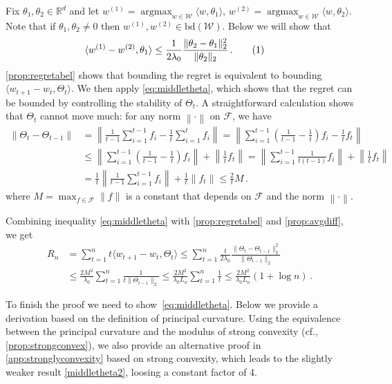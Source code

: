 \documentclass[english]{article}
\newcommand{\cW}{\mathcal{W}}
\newcommand{\cF}{\mathcal{F}}
\newcommand{\real}{\mathbb{R}}
\newcommand{\inpro}[2]{\langle #1, #2\rangle}
\newcommand{\ip}[1]{\langle#1\rangle}
\newcommand{\norm}[1]{\left\| #1 \right\|}
\newcommand{\bd}{\mathrm{bd}}
\newcommand\numberthis{\addtocounter{equation}{1}\tag{\theequation}}
\DeclareMathOperator*{\argmax}{argmax}
\newenvironment{proofof}[1]{\par\noindent{\bf Proof of #1\ }}{\hfill\BlackBox\\[2mm]}
\begin{document}
\begin{proofof}{\cref{thm:R_curvesurface}}
Fix  $\theta_1, \theta_2 \in \real^d$ and let 
$w^{(1)} = \argmax_{w\in\cW}\inpro{w}{\theta_1}$,
$w^{(2)} = \argmax_{w\in\cW}\inpro{w}{\theta_2}$. 
Note that if $\theta_1,\theta_2\ne 0$ then $w^{(1)} , w^{(2)}  \in \bd(\cW)$. 
Below we will show that
\begin{align*}
\inpro{w^{(1)} - w^{(2)} }{\theta_1} 
	& \le \frac{1}{2\lambda_0} \frac{\|\theta_2 - \theta_1\|_2^2}{\|\theta_2\|_2}\,.
	 \numberthis\label{eq:middletheta}
\end{align*}
\cref{prop:regretabel} shows that bounding the regret is equivalent to bounding $\ip{w_{t+1}-w_t,\Theta_t}$. We then apply \eqref{eq:middletheta}, which
shows that the regret can be bounded by controlling the stability of $\Theta_t$.
A straightforward calculation shows that $\Theta_t$ cannot move much:
for any norm $\norm{\cdot}$ on $\cF$, we have 
\begin{align}
\|\Theta_t - \Theta_{t-1} \| & = \left\|\frac{1}{t-1}\sum_{i=1}^{t-1} f_i - \frac{1}{t}\sum_{i=1}^{t} f_i \right\| 
	 = \left\| \sum_{i=1}^{t-1} \left( \frac{1}{t-1} - \frac{1}{t}\right) f_i- \frac{1}{t}f_t\right\| \nonumber \\
	& \le \left\| \sum_{i=1}^{t-1} \left( \frac{1}{t-1} - \frac{1}{t}\right) f_i \right\| + \left\| \frac{1}{t}f_t\right\| 
	 = \left\| \sum_{i=1}^{t-1} \frac{1}{t(t-1)} f_i \right\| + \left\| \frac{1}{t}f_t\right\| \nonumber \\
	 & = \frac{1}{t} \left\| \frac{1}{t-1} \sum_{i=1}^{t-1} f_i\right\| + \frac{1}{t}\left\|f_t\right\| 
	 \le \frac{2}{t}M\,. \label{prop:avgdiff}
\end{align}
where $M = \max_{f\in\cF} \|f\|$ is a constant that depends on $\cF$ and the norm $\norm{\cdot}$.

Combining inequality \eqref{eq:middletheta} with \cref{prop:regretabel} and \eqref{prop:avgdiff}, we get
\begin{align*}
R_n &= \sum_{t=1}^{n} t\ip{ w_{t+1}-w_t,\Theta_t} 
\le \sum_{t=1}^{n} \frac{t}{2\lambda_0} \frac{\|\Theta_t - \Theta_{t-1}\|_2^2}{\|\Theta_{t-1}\|_2} \\
&\le \frac{2M^2}{\lambda_0}\sum_{t=1}^{n} \frac{1}{t\|\Theta_{t-1}\|_2} \le \frac{2M^2}{\lambda_0L_n} \sum_{t=1}^{n} \frac{1}{t}
\le \frac{2M^2}{\lambda_0L_n} (1+\log n)\,.
\end{align*}

To finish the proof we need to show~\eqref{eq:middletheta}. Below we provide a derivation based on the definition of principal curvature.
Using the equivalence between the principal curvature and the modulus of strong convexity (cf., \cref{prop:strongconvex}), we also provide an alternative proof in \cref{app:stronglyconvexity} based on strong convexity, which leads to the slightly weaker result \eqref{middletheta2}, loosing a constant factor of 4. 



\end{proofof}
\end{document}
